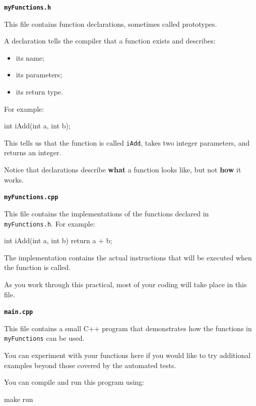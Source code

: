 \documentclass{csc2059practical}
\begin{document}
\begin{infobox}
\textbf{\texttt{myFunctions.h}}

This file contains function declarations, sometimes called prototypes.

A declaration tells the compiler that a function exists and describes:

\begin{itemize}
  \item its name;
  \item its parameters;
  \item its return type.
\end{itemize}

For example:

\begin{cppcode}
int iAdd(int a, int b);
\end{cppcode}

This tells us that the function is called \texttt{iAdd}, takes two integer parameters, and returns an integer.

Notice that declarations describe \textbf{what} a function looks like, but not \textbf{how} it works.
\end{infobox}

\begin{infobox}
\textbf{\texttt{myFunctions.cpp}}

This file contains the implementations of the functions declared in \texttt{myFunctions.h}. For example:

\begin{cppcode}
int iAdd(int a, int b)
{
    return a + b;
}
\end{cppcode}

The implementation contains the actual instructions that will be executed when the function is called.

As you work through this practical, most of your coding will take place in this file.
\end{infobox}

\begin{infobox}
\textbf{\texttt{main.cpp}}

This file contains a small C++ program that demonstrates how the functions in \texttt{myFunctions} can be used.

You can experiment with your functions here if you would like to try additional examples beyond those covered by the automated tests.

You can compile and run this program using:

\begin{bashcode}
make run
\end{bashcode}
\end{infobox}
\end{document}
